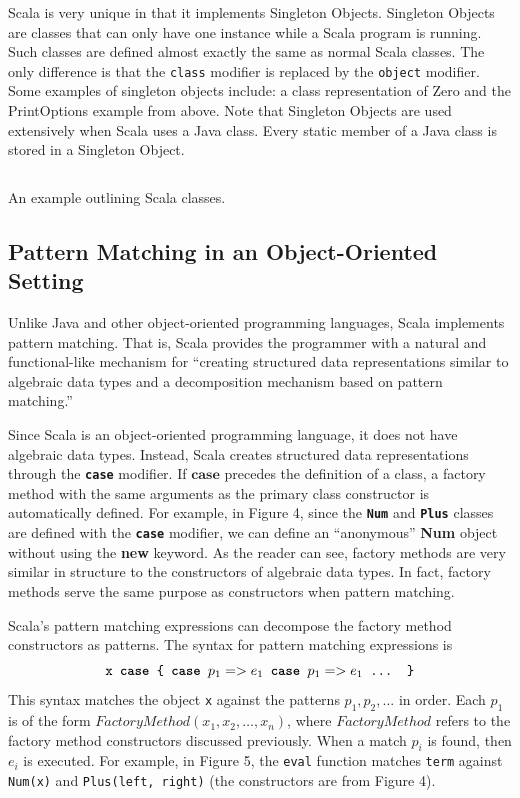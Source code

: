 \documentclass[jou,apacite]{IEEEtran}
\begin{document}
Scala is very unique in that it implements Singleton Objects. Singleton Objects
are classes that can only have one instance while a Scala program is
running. Such classes are defined almost exactly the same as normal Scala
classes. The only difference is that the \texttt{class} modifier is replaced by
the \texttt{object} modifier. Some examples of singleton objects include: a
class representation of Zero and the PrintOptions example from above. Note that
Singleton Objects are used extensively when Scala uses a Java class. Every
static member of a Java class is stored in a Singleton Object.

\begin{listing}
  \inputminted{Scala}{../examples/Nat.scala}
  \caption{An example outlining Scala classes.}
  \label{lst:nats-example}
\end{listing}

\subsection{Pattern Matching in an Object-Oriented Setting}
Unlike Java and other object-oriented programming languages, Scala implements
pattern matching. That is, Scala provides the programmer with a natural and
functional-like mechanism for ``creating structured data representations similar
to algebraic data types and a decomposition mechanism based on pattern
matching.''


Since Scala is an object-oriented programming language, it does not have
algebraic data types. Instead, Scala creates structured data representations
through the \texttt{\textbf{case}} modifier. If $\textbf{case}$ precedes the
definition of a class, a factory method with the same arguments as the primary
class constructor is automatically defined. For example, in Figure 4, since the
\texttt{\textbf{Num}} and \texttt{\textbf{Plus}} classes are defined with the
\texttt{\textbf{case}} modifier, we can define an “anonymous” \textbf{Num}
object without using the \textbf{new} keyword. As the reader can see, factory
methods are very similar in structure to the constructors of algebraic data
types. In fact, factory methods serve the same purpose as constructors when
pattern matching.

Scala's pattern matching expressions can decompose the factory method
constructors as patterns. The syntax for pattern matching expressions is
\[                              %
    \texttt{x \textbf{case} \{ \textbf{case} $p_1 => e_1$ \textbf{case} $p_1 => e_1$ ... \}}
\]
This syntax matches the object \texttt{x} against the patterns $p_1, p_2, ...$
in order. Each $p_1$ is of the form $FactoryMethod(x_1, x_2, …, x_n)$, where
$FactoryMethod$ refers to the factory method constructors discussed
previously. When a match $p_i$ is found, then $e_i$ is executed. For example, in
Figure 5, the \texttt{eval} function matches \texttt{term} against
\texttt{Num(x)} and \texttt{Plus(left, right)} (the constructors are from Figure
4).
\end{document}
